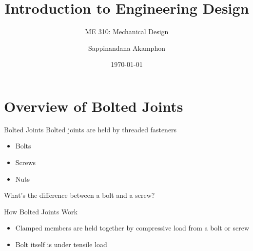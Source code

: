\documentclass[10pt, svgnames]{beamer}
\author{Sappinandana Akamphon}
\date{\today}
\title{Introduction to Engineering Design}
\subtitle{ME 310: Mechanical Design}
\institute{Department of Mechanical Engineering, TSE}
\begin{document}
\maketitle

\section{Overview of Bolted Joints}
\label{sec:org3f98797}

\begin{frame}[label={sec:org96846f8}]{Bolted Joints}
Bolted joints are held by threaded fasteners
\begin{itemize}
\item Bolts
\item Screws
\item Nuts
\end{itemize}

What's the difference between a bolt and a screw?
\end{frame}

\begin{frame}[label={sec:org92b9db6}]{How Bolted Joints Work}
\begin{itemize}
\item Clamped members are held together by compressive load from a bolt or screw
\item Bolt itself is under tensile load
\end{itemize}
\end{frame}
\end{document}
